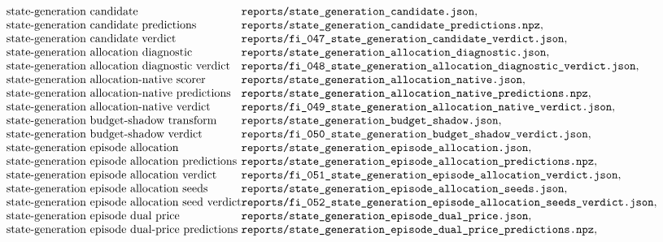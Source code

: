 $$\begin{array}{@{}l@{}l@{}}
\text{state-generation candidate} & \texttt{reports/state\_generation\_candidate.json},\\
\text{state-generation candidate predictions} & \texttt{reports/state\_generation\_candidate\_predictions.npz},\\
\text{state-generation candidate verdict} & \texttt{reports/fi\_047\_state\_generation\_candidate\_verdict.json},\\
\text{state-generation allocation diagnostic} & \texttt{reports/state\_generation\_allocation\_diagnostic.json},\\
\text{state-generation allocation diagnostic verdict} & \texttt{reports/fi\_048\_state\_generation\_allocation\_diagnostic\_verdict.json},\\
\text{state-generation allocation-native scorer} & \texttt{reports/state\_generation\_allocation\_native.json},\\
\text{state-generation allocation-native predictions} & \texttt{reports/state\_generation\_allocation\_native\_predictions.npz},\\
\text{state-generation allocation-native verdict} & \texttt{reports/fi\_049\_state\_generation\_allocation\_native\_verdict.json},\\
\text{state-generation budget-shadow transform} & \texttt{reports/state\_generation\_budget\_shadow.json},\\
\text{state-generation budget-shadow verdict} & \texttt{reports/fi\_050\_state\_generation\_budget\_shadow\_verdict.json},\\
\text{state-generation episode allocation} & \texttt{reports/state\_generation\_episode\_allocation.json},\\
\text{state-generation episode allocation predictions} & \texttt{reports/state\_generation\_episode\_allocation\_predictions.npz},\\
\text{state-generation episode allocation verdict} & \texttt{reports/fi\_051\_state\_generation\_episode\_allocation\_verdict.json},\\
\text{state-generation episode allocation seeds} & \texttt{reports/state\_generation\_episode\_allocation\_seeds.json},\\
\text{state-generation episode allocation seed verdict} & \texttt{reports/fi\_052\_state\_generation\_episode\_allocation\_seeds\_verdict.json},\\
\text{state-generation episode dual price} & \texttt{reports/state\_generation\_episode\_dual\_price.json},\\
\text{state-generation episode dual-price predictions} & \texttt{reports/state\_generation\_episode\_dual\_price\_predictions.npz},\\

\end{array}$$
